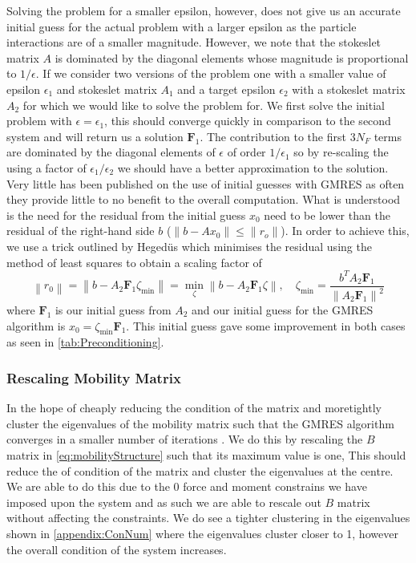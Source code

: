 Solving the problem for a smaller epsilon, however, does not give us an accurate initial guess for the actual problem with a larger epsilon as the particle interactions are of a smaller magnitude. However, we note that the stokeslet matrix $A$ is dominated by the diagonal elements whose magnitude is proportional to $1/\epsilon$. If we consider two versions of the problem one with a smaller value of epsilon $\epsilon_1$ and stokeslet matrix $A_1$ and a target epsilon $\epsilon_2$ with a stokeslet matrix $A_2$ for which we would like to solve the problem for. We first solve the initial problem with $\epsilon=\epsilon_1$, this should converge quickly in comparison to the second system and will return us a solution $\bm{F}_1$. The contribution to the first $3N_{F}$ terms are dominated by the diagonal elements of $\epsilon$ of order $1/\epsilon_1$ so by re-scaling the using a factor of $\epsilon_1/\epsilon_2$ we should have a better approximation to the solution. Very little has been published on the use of initial guesses with GMRES as often they provide little to no benefit to the overall computation. What is understood is the need for the residual from the initial guess $x_0$ need to be lower than the residual of the right-hand side $b$ ($\lVert b-Ax_0 \rVert \leq \lVert r_o \rVert$). In order to achieve this, we use a trick outlined by Heged{\"u}s \cite{Saad1986GMRES:Systems,Strakos2005OnComputations} which minimises the residual using the method of least squares to obtain a scaling factor of 
\begin{equation*}
    \left\|r_{0}\right\|=\left\|b-A_2 \bm{F}_1 \zeta_{\min }\right\|=\min _{\zeta}\left\|b-A_2 \bm{F}_1 \zeta\right\|, \quad \zeta_{\min }=\frac{b^{T} A_2 \bm{F}_1}{\left\|A_2 \bm{F}_1\right\|^{2}}
    \label{eq:Hegedus}
\end{equation*}
where $\bm{F}_1$ is our initial guess from $A_2$ and our initial guess for the GMRES algorithm is $x_0 = \zeta_{\min} \bm{F}_1$. This initial guess gave some improvement in both cases as seen in \cref{tab:Preconditioning}.

\subsubsection{Rescaling Mobility Matrix} \label{sec:Rescale}
In the hope of cheaply reducing the condition of the matrix and moretightly cluster the eigenvalues of the mobility matrix such that the GMRES algorithm converges in a smaller number of iterations \cite{CampbellGMRES}. We do this by rescaling the $B$ matrix in \cref{eq:mobilityStructure} such that its maximum value is one, This should reduce the of condition of the matrix and cluster the eigenvalues at the centre. We are able to do this due to the $0$ force and moment constrains we have imposed upon the system and as such we are able to rescale out $B$ matrix without affecting the constraints. 
We do see a tighter clustering in the eigenvalues shown in \cref{appendix:ConNum} where the eigenvalues cluster closer to 1, however the overall condition of the system increases.


